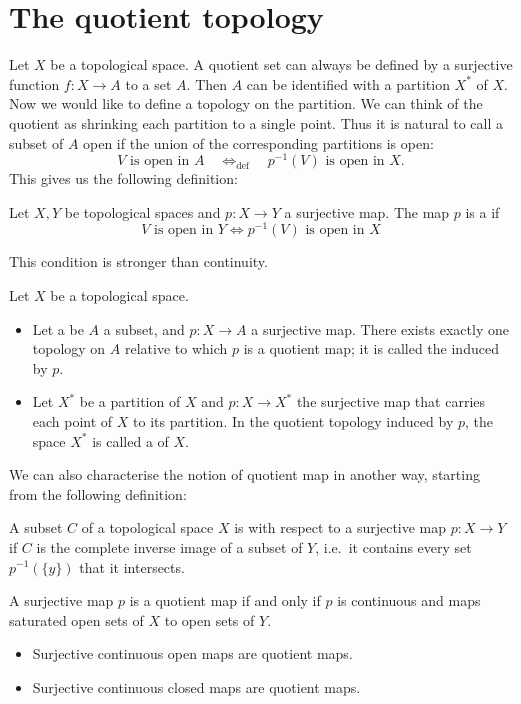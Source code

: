 \section{The quotient topology}
Let $X$ be a topological space. A quotient set can always be defined by a surjective function $f:X\to A$ to a set $A$. Then $A$ can be identified with a partition $X^*$ of $X$. Now we would like to define a topology on the partition. We can think of the quotient as shrinking each partition to a single point. Thus it is natural to call a subset of $A$ open if the union of the corresponding partitions is open:
\[ \text{$V$ is open in $A$}\quad \Leftrightarrow_{\text{def}}\quad \text{$p^{-1}(V)$ is open in $X$}. \]
This gives us the following definition:
\begin{definition}
Let $X,Y$ be topological spaces and $p:X\to Y$ a surjective map. The map $p$ is a  if
\[ \text{$V$ is open in $Y$} \iff \text{$p^{-1}(V)$ is open in $X$} \]
\end{definition}
This condition is stronger than continuity.
\begin{definition}
Let $X$ be a topological space.
\begin{itemize}
\item Let a be $A$ a subset, and $p:X\to A$ a surjective map. There exists exactly one topology on $A$ relative to which $p$ is a quotient map; it is called the  induced by $p$.
\item Let $X^*$ be a partition of $X$ and $p:X\to X^*$ the surjective map that carries each point of $X$ to its partition. In the quotient topology induced by $p$, the space $X^*$ is called a  of $X$.
\end{itemize}
\end{definition}
We can also characterise the notion of quotient map in another way, starting from the following definition:
\begin{definition}
A subset $C$ of a topological space $X$ is  with respect to a surjective map $p:X\to Y$ if $C$ is the complete inverse image of a subset of $Y$, i.e.\ it contains every set $p^{-1}(\{y\})$ that it intersects.
\end{definition}
\begin{lemma}
A surjective map $p$ is a quotient map \textup{if and only if} $p$ is continuous and maps saturated open sets of $X$ to open sets of $Y$.
\end{lemma}
\begin{corollary}
\begin{itemize}
\item Surjective continuous open maps are quotient maps.
\item Surjective continuous closed maps are quotient maps.
\end{itemize}
\end{corollary}
